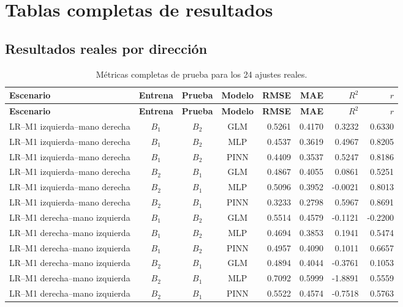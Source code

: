 \chapter{Tablas completas de resultados}

\section{Resultados reales por dirección}
\begin{landscape}
\small
\begin{longtable}{p{4.2cm}cccrrrr}
\caption{Métricas completas de prueba para los 24 ajustes reales.}\label{tab:real_full}\\
\toprule
\textbf{Escenario} & \textbf{Entrena} & \textbf{Prueba} & \textbf{Modelo} & \textbf{RMSE} & \textbf{MAE} & $R^2$ & $r$ \\
\midrule
\endfirsthead
\toprule
\textbf{Escenario} & \textbf{Entrena} & \textbf{Prueba} & \textbf{Modelo} & \textbf{RMSE} & \textbf{MAE} & $R^2$ & $r$ \\
\midrule
\endhead
LR--M1 izquierda--mano derecha & $B_1$ & $B_2$ & GLM & 0.5261 & 0.4170 & 0.3232 & 0.6330 \\
LR--M1 izquierda--mano derecha & $B_1$ & $B_2$ & MLP & 0.4537 & 0.3619 & 0.4967 & 0.8205 \\
LR--M1 izquierda--mano derecha & $B_1$ & $B_2$ & PINN & 0.4409 & 0.3537 & 0.5247 & 0.8186 \\
LR--M1 izquierda--mano derecha & $B_2$ & $B_1$ & GLM & 0.4867 & 0.4055 & 0.0861 & 0.5251 \\
LR--M1 izquierda--mano derecha & $B_2$ & $B_1$ & MLP & 0.5096 & 0.3952 & -0.0021 & 0.8013 \\
LR--M1 izquierda--mano derecha & $B_2$ & $B_1$ & PINN & 0.3233 & 0.2798 & 0.5967 & 0.8691 \\
LR--M1 derecha--mano izquierda & $B_1$ & $B_2$ & GLM & 0.5514 & 0.4579 & -0.1121 & -0.2200 \\
LR--M1 derecha--mano izquierda & $B_1$ & $B_2$ & MLP & 0.4694 & 0.3853 & 0.1941 & 0.5474 \\
LR--M1 derecha--mano izquierda & $B_1$ & $B_2$ & PINN & 0.4957 & 0.4090 & 0.1011 & 0.6657 \\
LR--M1 derecha--mano izquierda & $B_2$ & $B_1$ & GLM & 0.4894 & 0.4044 & -0.3761 & 0.1053 \\
LR--M1 derecha--mano izquierda & $B_2$ & $B_1$ & MLP & 0.7092 & 0.5999 & -1.8891 & 0.5559 \\
LR--M1 derecha--mano izquierda & $B_2$ & $B_1$ & PINN & 0.5522 & 0.4574 & -0.7518 & 0.5763 \\

\end{longtable}
\end{landscape}
